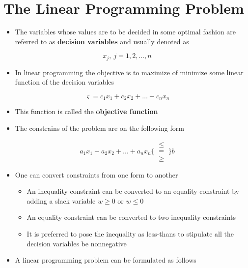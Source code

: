 \documentclass[11pt]{article}
\author{Martin Nørskov Jensen}
\date{\today}
\title{}
\begin{document}
\tableofcontents

\section{The Linear Programming Problem}
\label{sec:org67560a9}
\begin{itemize}
\item The variables whose values are to be decided in some optimal fashion are referred to as \textbf{decision variables} and usually denoted as
\end{itemize}
\begin{equation}
  x_j, \ j=1,2,\dots,n
\end{equation}
\begin{itemize}
\item In linear programming the objective is to maximize of minimize some linear function of the decision variables
\end{itemize}
\begin{equation}
	\varsigma = c_1x_1 + c_2x_2 + \dots + c_nx_n
\end{equation} 
\begin{itemize}
\item This function is called the \textbf{objective function}
\item The constrains of the problem are on the following form
\end{itemize}
\begin{equation}
  a_1x_1 + a_2x_2 + \dots + a_nx_n \Bigg\{ \ \begin{matrix} \leq \\ = \\ \geq \end{matrix} \ \Bigg\} b \end{equation}
\begin{itemize}
\item One can convert constraints from one form to another
\begin{itemize}
\item An inequality constraint can be converted to an equality constraint by adding a slack variable \(w \geq 0\) or \(w \leq 0\)
\item An equality constraint can be converted to two inequality constraints
\item It is preferred to pose the inequality as less-thans to stipulate all the decision variables be nonnegative
\end{itemize}

\item A linear programming problem can be formulated as follows
\end{itemize}
\end{document}
